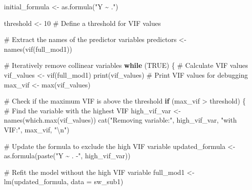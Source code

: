 \documentclass[
  letterpaper,
]{book}
\newenvironment{Shaded}{\begin{snugshade}}{\end{snugshade}}
\newcommand{\AttributeTok}[1]{\textcolor[rgb]{0.40,0.45,0.13}{#1}}
\newcommand{\CommentTok}[1]{\textcolor[rgb]{0.37,0.37,0.37}{#1}}
\newcommand{\ConstantTok}[1]{\textcolor[rgb]{0.56,0.35,0.01}{#1}}
\newcommand{\ControlFlowTok}[1]{\textcolor[rgb]{0.00,0.23,0.31}{\textbf{#1}}}
\newcommand{\DecValTok}[1]{\textcolor[rgb]{0.68,0.00,0.00}{#1}}
\newcommand{\FunctionTok}[1]{\textcolor[rgb]{0.28,0.35,0.67}{#1}}
\newcommand{\NormalTok}[1]{\textcolor[rgb]{0.00,0.23,0.31}{#1}}
\newcommand{\OtherTok}[1]{\textcolor[rgb]{0.00,0.23,0.31}{#1}}
\newcommand{\SpecialCharTok}[1]{\textcolor[rgb]{0.37,0.37,0.37}{#1}}
\newcommand{\StringTok}[1]{\textcolor[rgb]{0.13,0.47,0.30}{#1}}
\begin{document}
\begin{Shaded}
\begin{Highlighting}[]
\NormalTok{initial\_formula }\OtherTok{\textless{}{-}} \FunctionTok{as.formula}\NormalTok{(}\StringTok{"Y \textasciitilde{} ."}\NormalTok{)}

\NormalTok{threshold }\OtherTok{\textless{}{-}} \DecValTok{10} \CommentTok{\# Define a threshold for VIF values}

\CommentTok{\# Extract the names of the predictor variables}
\NormalTok{predictors }\OtherTok{\textless{}{-}} \FunctionTok{names}\NormalTok{(}\FunctionTok{vif}\NormalTok{(full\_mod1))}

\CommentTok{\# Iteratively remove collinear variables}
\ControlFlowTok{while}\NormalTok{ (}\ConstantTok{TRUE}\NormalTok{) \{}
  \CommentTok{\# Calculate VIF values}
\NormalTok{  vif\_values }\OtherTok{\textless{}{-}} \FunctionTok{vif}\NormalTok{(full\_mod1)}
  \FunctionTok{print}\NormalTok{(vif\_values) }\CommentTok{\# Print VIF values for debugging}
\NormalTok{  max\_vif }\OtherTok{\textless{}{-}} \FunctionTok{max}\NormalTok{(vif\_values)}
  
  \CommentTok{\# Check if the maximum VIF is above the threshold}
  \ControlFlowTok{if}\NormalTok{ (max\_vif }\SpecialCharTok{\textgreater{}}\NormalTok{ threshold) \{}
    \CommentTok{\# Find the variable with the highest VIF}
\NormalTok{    high\_vif\_var }\OtherTok{\textless{}{-}} \FunctionTok{names}\NormalTok{(}\FunctionTok{which.max}\NormalTok{(vif\_values))}
    \FunctionTok{cat}\NormalTok{(}\StringTok{"Removing variable:"}\NormalTok{,}
\NormalTok{        high\_vif\_var,}
        \StringTok{"with VIF:"}\NormalTok{,}
\NormalTok{        max\_vif,}
        \StringTok{"}\SpecialCharTok{\textbackslash{}n}\StringTok{"}\NormalTok{)}
    
    \CommentTok{\# Update the formula to exclude the high VIF variable}
\NormalTok{    updated\_formula }\OtherTok{\textless{}{-}} \FunctionTok{as.formula}\NormalTok{(}\FunctionTok{paste}\NormalTok{(}\StringTok{"Y \textasciitilde{} . {-}"}\NormalTok{, high\_vif\_var))}
    
    \CommentTok{\# Refit the model without the high VIF variable}
\NormalTok{    full\_mod1 }\OtherTok{\textless{}{-}} \FunctionTok{lm}\NormalTok{(updated\_formula, }\AttributeTok{data =}\NormalTok{ sw\_sub1)}
    

\end{Highlighting}
\end{Shaded}
\end{document}
